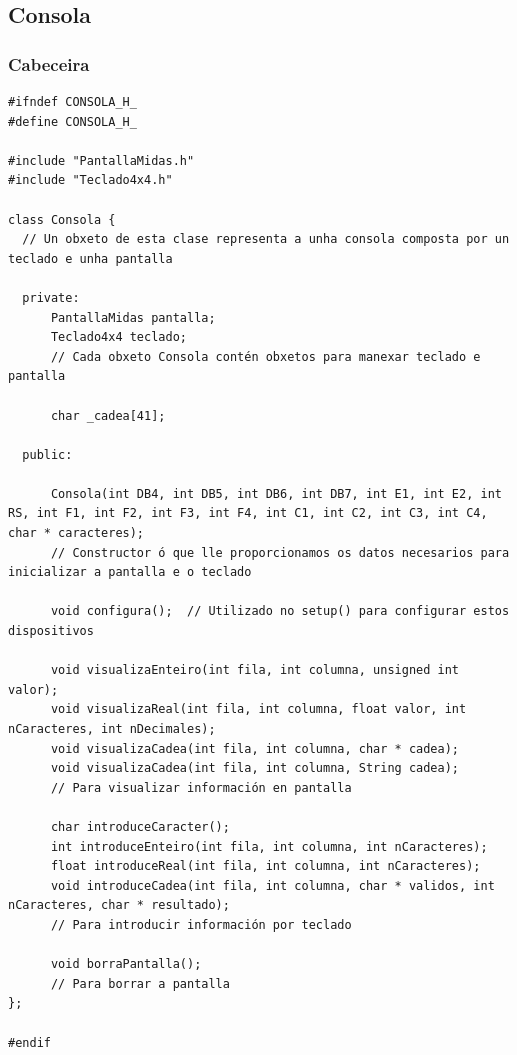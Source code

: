 \documentclass[11pt,twoside]{book}
\begin{document}
\subsection{Consola}
\subsubsection{Cabeceira}
\begin{lstlisting}
#ifndef CONSOLA_H_
#define CONSOLA_H_

#include "PantallaMidas.h"
#include "Teclado4x4.h"

class Consola {
  // Un obxeto de esta clase representa a unha consola composta por un teclado e unha pantalla
  
  private:
      PantallaMidas pantalla;
      Teclado4x4 teclado;
      // Cada obxeto Consola contén obxetos para manexar teclado e pantalla
      
      char _cadea[41];
      
  public: 
  
      Consola(int DB4, int DB5, int DB6, int DB7, int E1, int E2, int RS, int F1, int F2, int F3, int F4, int C1, int C2, int C3, int C4, char * caracteres);
      // Constructor ó que lle proporcionamos os datos necesarios para inicializar a pantalla e o teclado
      
      void configura();  // Utilizado no setup() para configurar estos dispositivos
      
      void visualizaEnteiro(int fila, int columna, unsigned int valor);
      void visualizaReal(int fila, int columna, float valor, int nCaracteres, int nDecimales);
      void visualizaCadea(int fila, int columna, char * cadea);  
      void visualizaCadea(int fila, int columna, String cadea);
      // Para visualizar información en pantalla
      
      char introduceCaracter();
      int introduceEnteiro(int fila, int columna, int nCaracteres);
      float introduceReal(int fila, int columna, int nCaracteres);
      void introduceCadea(int fila, int columna, char * validos, int nCaracteres, char * resultado);
      // Para introducir información por teclado
      
      void borraPantalla();
      // Para borrar a pantalla
};

#endif
\end{lstlisting}
\end{document}
